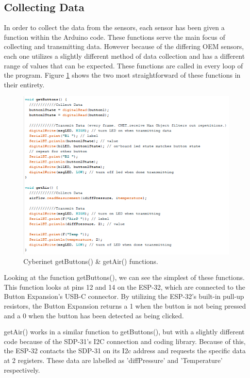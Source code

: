 \subsection{Collecting Data}
In order to collect the data from the sensors, each sensor has been given a function within the Arduino code. These functions serve the main focus of collecting and transmitting data. However because of the differing OEM sensors, each one utilizes a slightly different method of data collection and has a different range of values that can be expected. These functions are called in every loop of the program. Figure \ref{fig:getButtonsGetAir} shows the two most straightforward of these functions in their entirety.

\begin{center}
    \begin{figure}
        \centering
        \includegraphics[scale=1.5]{diagrams/maxPatches/getbuttonsgetair.png}
        \caption{Cyberinet getButtons() \& getAir() functions.}
        \label{fig:getButtonsGetAir}
    \end{figure}
\end{center}

Looking at the function getButtons(), we can see the simplest of these functions. This function looks at pins 12 and 14 on the ESP-32, which are connected to the Button Expansion's USB-C connector. By utilizing the ESP-32's built-in pull-up resistors, the Button Expansion returns a 1 when the button is not being pressed and a 0 when the button has been detected as being clicked.

getAir() works in a similar function to getButtons(), but with a slightly different code because of the SDP-31's I2C connection and coding library. Because of this, the ESP-32 contacts the SDP-31 on its I2c address and requests the specific data at 2 registers. These data are labelled as 'diffPressure' and 'Temperature' respectively. 

